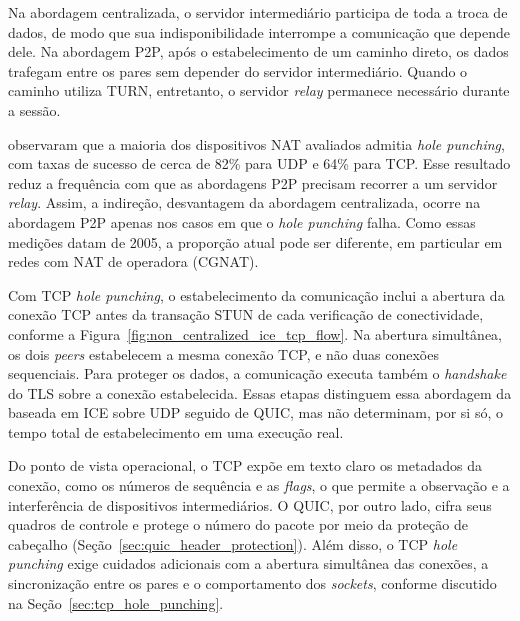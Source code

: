 Na abordagem centralizada, o servidor intermediário participa de toda a troca de dados, de modo que sua indisponibilidade interrompe a comunicação que depende dele. Na abordagem P2P, após o estabelecimento de um caminho direto, os dados trafegam entre os pares sem depender do servidor intermediário. Quando o caminho utiliza TURN, entretanto, o servidor \textit{relay} permanece necessário durante a sessão.

\citet{ford2005peer} observaram que a maioria dos dispositivos NAT avaliados admitia \textit{hole punching}, com taxas de sucesso de cerca de 82\% para UDP e 64\% para TCP. Esse resultado reduz a frequência com que as abordagens P2P precisam recorrer a um servidor \textit{relay}. Assim, a indireção, desvantagem da abordagem centralizada, ocorre na abordagem P2P apenas nos casos em que o \textit{hole punching} falha. Como essas medições datam de 2005, a proporção atual pode ser diferente, em particular em redes com NAT de operadora (CGNAT).

Com TCP \textit{hole punching}, o estabelecimento da comunicação inclui a abertura da conexão TCP antes da transação STUN de cada verificação de conectividade, conforme a Figura~\ref{fig:non_centralized_ice_tcp_flow}. Na abertura simultânea, os dois \textit{peers} estabelecem a mesma conexão TCP, e não duas conexões sequenciais. Para proteger os dados, a comunicação executa também o \textit{handshake} do TLS sobre a conexão estabelecida. Essas etapas distinguem essa abordagem da baseada em ICE sobre UDP seguido de QUIC, mas não determinam, por si só, o tempo total de estabelecimento em uma execução real.

Do ponto de vista operacional, o TCP expõe em texto claro os metadados da conexão, como os números de sequência e as \textit{flags}, o que permite a observação e a interferência de dispositivos intermediários. O QUIC, por outro lado, cifra seus quadros de controle e protege o número do pacote por meio da proteção de cabeçalho (Seção~\ref{sec:quic_header_protection}). Além disso, o TCP \textit{hole punching} exige cuidados adicionais com a abertura simultânea das conexões, a sincronização entre os pares e o comportamento dos \textit{sockets}, conforme discutido na Seção~\ref{sec:tcp_hole_punching}.